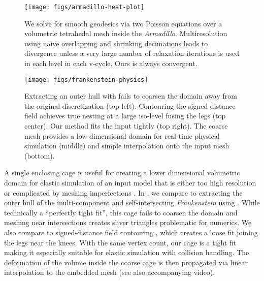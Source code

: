 \begin{figure}
  \texttt{[image: figs/armadillo-heat-plot]}
  \caption{We solve for smooth geodesics via two Poisson equations over a
  volumetric tetrahedal mesh inside the \emph{Armadillo}. Multiresolution using
  naive overlapping and shrinking decimations leads to divergence unless a very
  large number of relaxation iterations is used in each level in each v-cycle.
  Ours is always convergent.}
  \label{fig:armadillo-heat-plot}
\end{figure}

\begin{figure}
  \texttt{[image: figs/frankenstein-physics]}
  \caption{Extracting an outer hull with \protect\cite{Jacobson:WN:2013} fails
  to coarsen the domain away from the original discretization (top left). Contouring
  the signed distance field \protect\cite{Xu:2014:SDF} achieves true nesting at
  a large iso-level fusing the legs (top center). Our method fits the input
  tightly (top right). The coarse mesh provides a low-dimensional domain for
  real-time physical simulation (middle) and simple interpolation onto the
  input mesh (bottom).}
  \label{fig:frankenstein-physics}
\end{figure}

A single enclosing cage is useful for creating a lower dimensional volumetric
domain for elastic simulation of an input model that is either too high
resolution or complicated by meshing imperfections \cite{Xu:2014:SDF}.
%
In , we compare to extracting the outer hull of
the multi-component and self-intersecting \emph{Frankenstein} using
\cite{Jacobson:WN:2013}.
%
While technically a ``perfectly tight fit'', this cage fails to coarsen the
domain and meshing near intersections creates sliver triangles problematic for
numerics.
%
We also compare to signed-distance field contouring \cite{Xu:2014:SDF}, which
creates a loose fit joining the legs near the knees.
%
With the same vertex count, our cage is a tight fit making it especially
suitable for elastic simulation with collision handling.
%
The deformation of the volume inside the coarse cage is then propagated via
linear interpolation to the embedded mesh (see also accompanying video).

